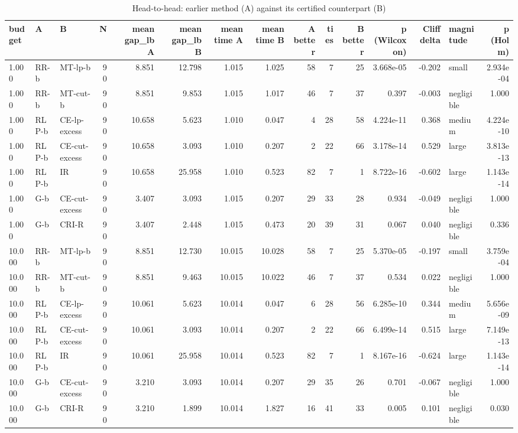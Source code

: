 \begin{table}[htbp]
\centering
\small
\caption{Head-to-head: earlier method (A) against its certified counterpart (B)}
\label{tab:E2b_head_to_head_budgets_pairs}
\begin{tabular}{lllrrrrrrrrrrlr}
\toprule
budget & A & B & N & mean gap\_lb A & mean gap\_lb B & mean time A & mean time B & A better & ties & B better & p (Wilcoxon) & Cliff delta & magnitude & p (Holm) \\
\midrule
1.000 & RR-b & MT-lp-b & 90 & 8.851 & 12.798 & 1.015 & 1.025 & 58 & 7 & 25 & 3.668e-05 & -0.202 & small & 2.934e-04 \\
1.000 & RR-b & MT-cut-b & 90 & 8.851 & 9.853 & 1.015 & 1.017 & 46 & 7 & 37 & 0.397 & -0.003 & negligible & 1.000 \\
1.000 & RLP-b & CE-lp-excess & 90 & 10.658 & 5.623 & 1.010 & 0.047 & 4 & 28 & 58 & 4.224e-11 & 0.368 & medium & 4.224e-10 \\
1.000 & RLP-b & CE-cut-excess & 90 & 10.658 & 3.093 & 1.010 & 0.207 & 2 & 22 & 66 & 3.178e-14 & 0.529 & large & 3.813e-13 \\
1.000 & RLP-b & IR & 90 & 10.658 & 25.958 & 1.010 & 0.523 & 82 & 7 & 1 & 8.722e-16 & -0.602 & large & 1.143e-14 \\
1.000 & G-b & CE-cut-excess & 90 & 3.407 & 3.093 & 1.015 & 0.207 & 29 & 33 & 28 & 0.934 & -0.049 & negligible & 1.000 \\
1.000 & G-b & CRI-R & 90 & 3.407 & 2.448 & 1.015 & 0.473 & 20 & 39 & 31 & 0.067 & 0.040 & negligible & 0.336 \\
10.000 & RR-b & MT-lp-b & 90 & 8.851 & 12.730 & 10.015 & 10.028 & 58 & 7 & 25 & 5.370e-05 & -0.197 & small & 3.759e-04 \\
10.000 & RR-b & MT-cut-b & 90 & 8.851 & 9.463 & 10.015 & 10.022 & 46 & 7 & 37 & 0.534 & 0.022 & negligible & 1.000 \\
10.000 & RLP-b & CE-lp-excess & 90 & 10.061 & 5.623 & 10.014 & 0.047 & 6 & 28 & 56 & 6.285e-10 & 0.344 & medium & 5.656e-09 \\
10.000 & RLP-b & CE-cut-excess & 90 & 10.061 & 3.093 & 10.014 & 0.207 & 2 & 22 & 66 & 6.499e-14 & 0.515 & large & 7.149e-13 \\
10.000 & RLP-b & IR & 90 & 10.061 & 25.958 & 10.014 & 0.523 & 82 & 7 & 1 & 8.167e-16 & -0.624 & large & 1.143e-14 \\
10.000 & G-b & CE-cut-excess & 90 & 3.210 & 3.093 & 10.014 & 0.207 & 29 & 35 & 26 & 0.701 & -0.067 & negligible & 1.000 \\
10.000 & G-b & CRI-R & 90 & 3.210 & 1.899 & 10.014 & 1.827 & 16 & 41 & 33 & 0.005 & 0.101 & negligible & 0.030 \\
\bottomrule
\end{tabular}
\end{table}

